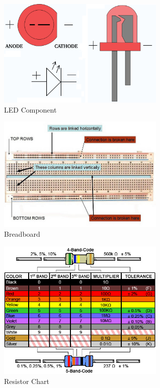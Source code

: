 %
\begin{figure}[ht]
	\centering
	\includegraphics[width=08cm]{images/16}
	\caption{LED Component \citep{sapkota-10}}
	\label{fig:led_component}
\end{figure}
%

%
\begin{figure}[ht]
	\centering
	\includegraphics[width=08cm]{images/17}
	\caption{Breadboard \citep{sapkota-10}}
	\label{fig:breadboard_component}
\end{figure}
%

%
\begin{figure}[ht]
	\centering
	\includegraphics[width=08cm]{images/18}
	\caption{Resistor Chart \citep{digikey-16}}
	\label{fig:resistor_component}
\end{figure}
%




